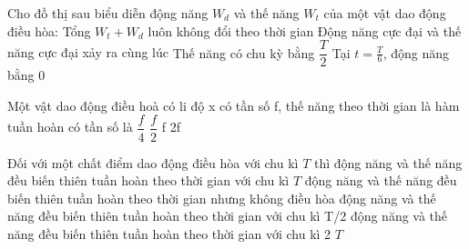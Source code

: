\begin{ex}
Cho đồ thị sau biểu diễn động năng $W_d$ và thế năng $W_t$ của một vật dao động điều hòa:
\choiceTF
{\True Tổng $W_t+W_d$ luôn không đổi theo thời gian}
{Động năng cực đại và thế năng cực đại xảy ra cùng lúc}
{\True Thế năng có chu kỳ bằng $\dfrac{T}{2}$}
{Tại $t=\frac{T}{6}$, động năng bằng 0}
\end{ex}

\begin{ex}
Một vật dao động điều hoà có li độ x có tần số f, thế năng theo thời gian là hàm tuần hoàn có tần số là
\choice
{$\dfrac{f}{4}$}
{$\dfrac{f}{2}$}
{f}
{\True 2f}
\end{ex}

\begin{ex}
Đối với một chất điểm dao động điều hòa với chu kì $T$ thì
\choice
{động năng và thế năng đều biến thiên tuần hoàn theo thời gian với chu kì $T$}
{động năng và thế năng đều biến thiên tuần hoàn theo thời gian nhưng không điều hòa}
{\True động năng và thế năng đều biến thiên tuần hoàn theo thời gian với chu kì T/2}
{động năng và thế năng đều biến thiên tuần hoàn theo thời gian với chu kì 2 $T$}
\end{ex}

